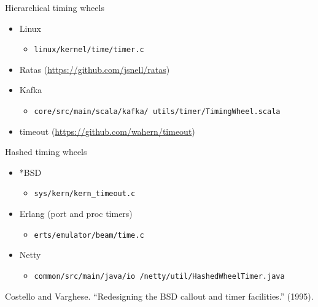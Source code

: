 \documentclass{beamer}
\begin{document}
\begin{frame}{Hierarchical timing wheels}
  \begin{itemize}
  \item Linux
    \begin{itemize}
    \item \texttt{linux/kernel/time/timer.c}
    \end{itemize}
  \item Ratas (\hyperlink{https://github.com/jsnell/ratas}{https://github.com/jsnell/ratas})
  \item Kafka
    \begin{itemize}
    \item \texttt{core/src/main/scala/kafka/ utils/timer/TimingWheel.scala}
    \end{itemize}
  \item timeout (\hyperlink{https://github.com/wahern/timeout}{https://github.com/wahern/timeout})
  \end{itemize}
\end{frame}




\begin{frame}{Hashed timing wheels}
  \begin{itemize}
  \item *BSD\
    \begin{itemize}
    \item \texttt{sys/kern/kern\_timeout.c}
    \end{itemize}
  \item Erlang (port and proc timers)
    \begin{itemize}
    \item \texttt{erts/emulator/beam/time.c}
    \end{itemize}
  \item Netty
    \begin{itemize}
    \item \texttt{common/src/main/java/io /netty/util/HashedWheelTimer.java}
    \end{itemize}
  \end{itemize}

  \vspace{2em}
  Costello and Varghese. ``Redesigning the BSD callout and timer facilities.'' (1995).
\end{frame}


\end{document}
